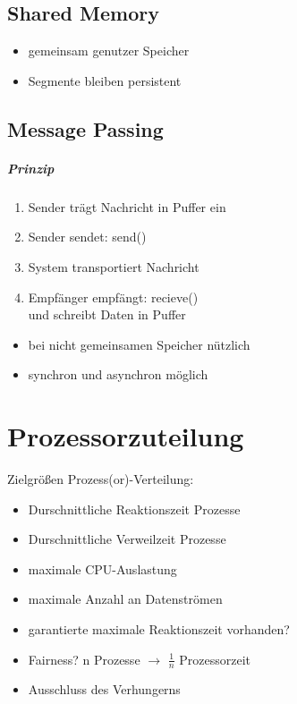 \documentclass{scrreprt}
\renewcommand{\imptnt}[1]{#1}
\begin{document}
\section{Shared Memory}
\begin{itemize}
\item gemeinsam genutzer Speicher
\item Segmente bleiben \imptnt{persistent}
\end{itemize}

\section{Message Passing}
\paragraph{Prinzip}
\begin{enumerate}
\item Sender trägt Nachricht in Puffer ein
\item Sender sendet: send()
\item System transportiert Nachricht
\item Empfänger empfängt: recieve()\\
und schreibt Daten in Puffer
\end{enumerate}
\begin{itemize}
\item bei nicht gemeinsamen Speicher nützlich
\item synchron und asynchron möglich
\end{itemize}

\chapter{Prozessorzuteilung}
Zielgrößen Prozess(or)-Verteilung:
\begin{itemize}
\item Durschnittliche Reaktionszeit Prozesse
\item Durschnittliche Verweilzeit Prozesse
\item maximale CPU-Auslastung
\item maximale Anzahl an Datenströmen
\item garantierte maximale Reaktionszeit vorhanden?
\item Fairness? n Prozesse $\to$ $\tfrac{1}{n}$ Prozessorzeit
\item Ausschluss des Verhungerns
\end{itemize}
\end{document}
